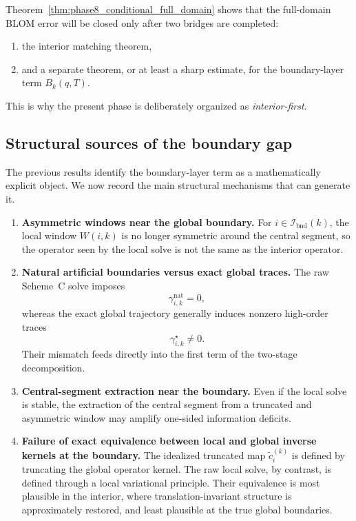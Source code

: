 \begin{remark}
\label{rem:phase8_meaning_of_full_domain}
Theorem~\ref{thm:phase8_conditional_full_domain} shows that the full-domain BLOM error will be closed only after two bridges are completed:
\begin{enumerate}
    \item the interior matching theorem,
    \item and a separate theorem, or at least a sharp estimate, for the boundary-layer term \(B_k(q,T)\).
\end{enumerate}
This is why the present phase is deliberately organized as \emph{interior-first}.
\end{remark}

\subsection{Structural sources of the boundary gap}
\label{subsec:phase8_boundary_sources}

The previous results identify the boundary-layer term as a mathematically explicit object.
We now record the main structural mechanisms that can generate it.

\begin{enumerate}
    \item \textbf{Asymmetric windows near the global boundary.}
    For \(i\in\mathcal I_{\mathrm{bnd}}(k)\), the local window \(W(i,k)\) is no longer symmetric around the central segment, so the operator seen by the local solve is not the same as the interior operator.

    \item \textbf{Natural artificial boundaries versus exact global traces.}
    The raw Scheme~C solve imposes
    \[
    \gamma_{i,k}^{\mathrm{nat}}=0,
    \]
    whereas the exact global trajectory generally induces nonzero high-order traces
    \[
    \gamma_{i,k}^{\star}\neq 0.
    \]
    Their mismatch feeds directly into the first term of the two-stage decomposition.

    \item \textbf{Central-segment extraction near the boundary.}
    Even if the local solve is stable, the extraction of the central segment from a truncated and asymmetric window may amplify one-sided information deficits.

    \item \textbf{Failure of exact equivalence between local and global inverse kernels at the boundary.}
    The idealized truncated map \(\tilde c_i^{(k)}\) is defined by truncating the global operator kernel.
    The raw local solve, by contrast, is defined through a local variational principle.
    Their equivalence is most plausible in the interior, where translation-invariant structure is approximately restored, and least plausible at the true global boundaries.
\end{enumerate}

